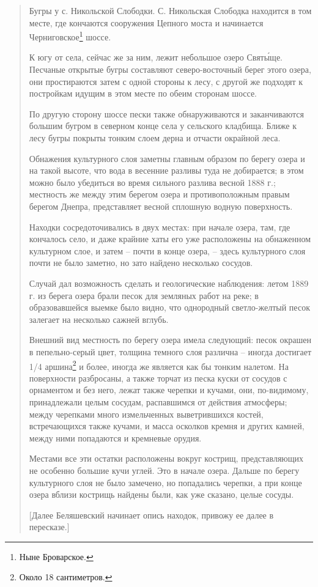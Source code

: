 \begin{quotation}
Бугры у с. Никольской Слободки. С. Никольская Слободка находится в том месте, где кончаются сооружения Цепного моста и начинается Черниговское\footnote{Ныне Броварское.} шоссе. 

К югу от села, сейчас же за ним, лежит небольшое озеро Свят\'ыще. Песчаные открытые бугры составляют северо-восточный берег этого озера, они простираются затем с одной стороны к лесу, с другой же подходят к постройкам идущим в этом месте по обеим сторонам шоссе.

По другую сторону шоссе пески также обнаруживаются и заканчиваются большим бугром в северном конце села у сельского кладбища. Ближе к лесу бугры покрыты тонким слоем дерна и отчасти окрайной леса.

Обнажения культурного слоя заметны главным образом по берегу озера и на такой высоте, что вода в весенние разливы туда не добирается; в этом можно было убедиться во время сильного разлива весной 1888 г.; местность же между этим берегом озера и противоположным правым берегом Днепра, представляет весной сплошную водную поверхность.

Находки сосредоточивались в двух местах: при начале озера, там, где кончалось село, и даже крайние хаты его уже расположены на обнаженном культурном слое, и затем – почти в конце озера, – здесь культурного слоя почти не было заметно, но зато найдено несколько сосудов.

Случай дал возможность сделать и геологические наблюдения: летом 1889 г. из берега озера брали песок для земляных работ на реке; в образовавшейся выемке было видно, что однородный светло-желтый песок залегает на несколько сажней вглубь.

Внешний вид местность по берегу озера имела следующий: песок окрашен в пепельно-се\-рый цвет, толщина темного слоя различна – иногда достигает 1/4 аршина\footnote{Около 18 сантиметров.} и более, иногда же является как бы тонким налетом. На поверхности разбросаны, а также торчат из песка куски от сосудов с орнаментом и без него, лежат также черепки и кучами, они, по-видимому, принадлежали целым сосудам, распавшимся от действия атмосферы; между черепками много измельченных выветрившихся костей, встречающихся также кучами, и масса осколков кремня и других камней, между ними попадаются и кремневые орудия.

Местами все эти остатки расположены вокруг кострищ, представляющих не особенно большие кучи углей. Это в начале озера. Дальше по берегу культурного слоя не было замечено, но попадались черепки, а при конце озера вблизи кострищь найдены были, как уже сказано, целые сосуды.

[Далее Беляшевский начинает опись находок, привожу ее далее в пересказе.]
\end{quotation}

